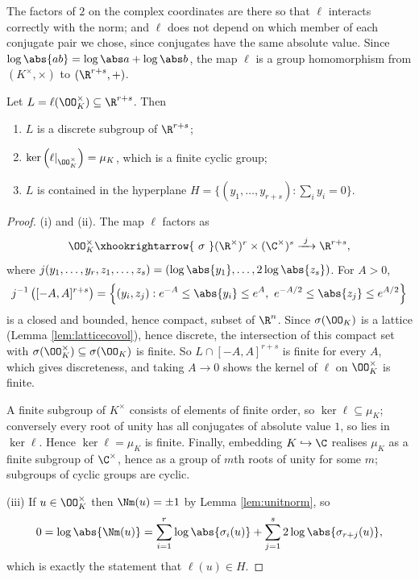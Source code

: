 The factors of $2$ on the complex coordinates are there so that $\ell$ interacts correctly with the norm; and $\ell$ does not depend on which member of each conjugate pair we chose, since conjugates have the same absolute value. Since $\log\abs{ab} = \log\abs a+\log\abs b$, the map $\ell$ is a group homomorphism from $(K^\times,\times)$ to $(\R^{r+s},+)$.

\begin{lemma}\label{lem:logimage}
	Let $L = \ell(\OO_K^\times) \subseteq \R^{r+s}$. Then
	\begin{enumerate}[label=(\roman*)]
		\item $L$ is a discrete subgroup of $\R^{r+s}$;
		\item $\ker\left(\ell|_{\OO_K^\times}\right) = \mu_K$, which is a finite cyclic group;
		\item $L$ is contained in the hyperplane $H = \{(y_1,\dots,y_{r+s}) : \sum_iy_i = 0\}$.
	\end{enumerate}
\end{lemma}

\begin{proof}
	(i) and (ii). The map $\ell$ factors as
	$$\OO_K^\times \xhookrightarrow{\ \sigma\ } (\R^\times)^r\times(\C^\times)^s \xrightarrow{\ j\ } \R^{r+s},$$
	where $j(y_1,\dots,y_r,z_1,\dots,z_s) = (\log\abs{y_1},\dots,2\log\abs{z_s})$. For $A>0$,
	$$j^{-1}\left([-A,A]^{r+s}\right) = \left\{(y_i,z_j) : e^{-A}\le\abs{y_i}\le e^A,\ e^{-A/2}\le\abs{z_j}\le e^{A/2}\right\}$$
	is a closed and bounded, hence compact, subset of $\R^n$. Since $\sigma(\OO_K)$ is a lattice (Lemma \ref{lem:latticecovol}), hence discrete, the intersection of this compact set with $\sigma(\OO_K^\times) \subseteq \sigma(\OO_K)$ is finite. So $L \cap [-A,A]^{r+s}$ is finite for every $A$, which gives discreteness, and taking $A \to 0$ shows the kernel of $\ell$ on $\OO_K^\times$ is finite.

	A finite subgroup of $K^\times$ consists of elements of finite order, so $\ker\ell \subseteq \mu_K$; conversely every root of unity has all conjugates of absolute value $1$, so lies in $\ker\ell$. Hence $\ker\ell = \mu_K$ is finite. Finally, embedding $K \hookrightarrow \C$ realises $\mu_K$ as a finite subgroup of $\C^\times$, hence as a group of $m$th roots of unity for some $m$; subgroups of cyclic groups are cyclic.

	(iii) If $u \in \OO_K^\times$ then $\Nm(u) = \pm1$ by Lemma \ref{lem:unitnorm}, so
	$$0 = \log\abs{\Nm(u)} = \sum_{i=1}^r\log\abs{\sigma_i(u)} + \sum_{j=1}^s2\log\abs{\sigma_{r+j}(u)},$$
	which is exactly the statement that $\ell(u) \in H$. \qedhere
\end{proof}

